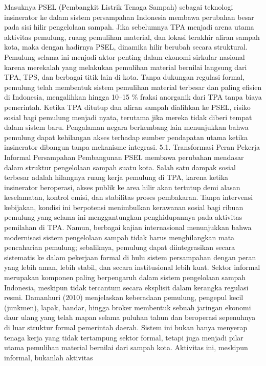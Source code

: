 \documentclass[
  letterpaper,
  DIV=11,
  numbers=noendperiod]{scrreprt}
\begin{document}
Masuknya PSEL (Pembangkit Listrik Tenaga Sampah) sebagai teknologi
insinerator ke dalam sistem persampahan Indonesia membawa perubahan
besar pada sisi hilir pengelolaan sampah. Jika sebelumnya TPA menjadi
arena utama aktivitas pemulung, ruang pemulihan material, dan lokasi
terakhir aliran sampah kota, maka dengan hadirnya PSEL, dinamika hilir
berubah secara struktural. Pemulung selama ini menjadi aktor penting
dalam ekonomi sirkular nasional karena merekalah yang melakukan
pemulihan material bernilai langsung dari TPA, TPS, dan berbagai titik
lain di kota. Tanpa dukungan regulasi formal, pemulung telah membentuk
sistem pemulihan material terbesar dan paling efisien di Indonesia,
mengalihkan hingga 10--15 \% fraksi anorganik dari TPA tanpa biaya
pemerintah. Ketika TPA ditutup dan aliran sampah dialihkan ke PSEL,
risiko sosial bagi pemulung menjadi nyata, terutama jika mereka tidak
diberi tempat dalam sistem baru. Pengalaman negara berkembang lain
menunjukkan bahwa pemulung dapat kehilangan akses terhadap sumber
pendapatan utama ketika insinerator dibangun tanpa mekanisme integrasi.
5.1. Transformasi Peran Pekerja Informal Persampahan Pembangunan PSEL
membawa perubahan mendasar dalam struktur pengelolaan sampah suatu kota.
Salah satu dampak sosial terbesar adalah hilangnya ruang kerja pemulung
di TPA, karena ketika insinerator beroperasi, akses publik ke area hilir
akan tertutup demi alasan keselamatan, kontrol emisi, dan stabilitas
proses pembakaran. Tanpa intervensi kebijakan, kondisi ini berpotensi
menimbulkan kerawanan sosial bagi ribuan pemulung yang selama ini
menggantungkan penghidupannya pada aktivitas pemilahan di TPA. Namun,
berbagai kajian internasional menunjukkan bahwa modernisasi sistem
pengelolaan sampah tidak harus menghilangkan mata pencaharian pemulung;
sebaliknya, pemulung dapat diintegrasikan secara sistematis ke dalam
pekerjaan formal di hulu sistem persampahan dengan peran yang lebih
aman, lebih stabil, dan secara institusional lebih kuat. Sektor informal
merupakan komponen paling berpengaruh dalam sistem pengelolaan sampah
Indonesia, meskipun tidak tercantum secara eksplisit dalam kerangka
regulasi resmi. Damanhuri (2010) menjelaskan keberadaan pemulung,
pengepul kecil (junkmen), lapak, bandar, hingga broker membentuk sebuah
jaringan ekonomi daur ulang yang telah mapan selama puluhan tahun dan
beroperasi sepenuhnya di luar struktur formal pemerintah daerah. Sistem
ini bukan hanya menyerap tenaga kerja yang tidak tertampung sektor
formal, tetapi juga menjadi pilar utama pemulihan material bernilai dari
sampah kota. Aktivitas ini, meskipun informal, bukanlah aktivitas
\end{document}
